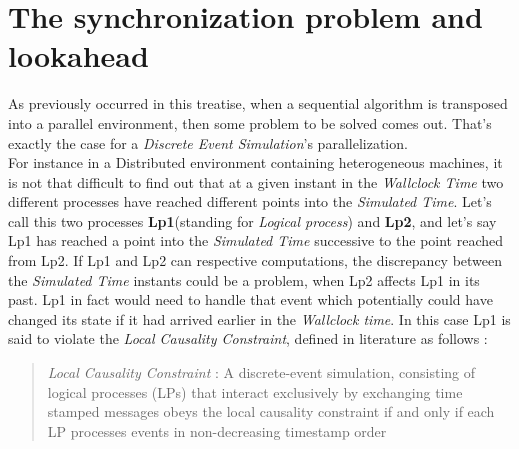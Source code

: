 \documentclass[12pt,a4paper,fleqn]{report}
\begin{document}
\section{The synchronization problem and lookahead}
As previously occurred in this treatise, when a sequential algorithm is transposed into a parallel environment, then some problem to be solved comes out. That's exactly the case for a \textit{Discrete Event Simulation}'s parallelization. \\
For instance in a Distributed environment containing heterogeneous machines, it is not that difficult to find out that at a given instant in the \textit{Wallclock Time} two different processes have reached different points into the \textit{Simulated Time}. Let's call this two processes \textbf{Lp1}(standing for \textit{Logical process}) and \textbf{Lp2}, and let's say Lp1 has reached a point into the \textit{Simulated Time} successive to the point reached from Lp2. If Lp1 and Lp2 can respective computations, the discrepancy between the \textit{Simulated Time} instants could be a problem, when Lp2 affects Lp1 in its past. Lp1 in fact would need to handle that event which potentially could have changed its state if it had arrived earlier in the \textit{Wallclock time}. In this case Lp1 is said to violate the \textit{Local Causality Constraint}, defined in literature as follows :
\begin{quotation}
\textit{Local Causality Constraint} : A discrete-event simulation, consisting of logical processes (LPs) that interact exclusively by exchanging time stamped messages obeys the local causality constraint if and only if each LP processes events in non-decreasing timestamp order \cite{0} 
\end{quotation}
\end{document}
